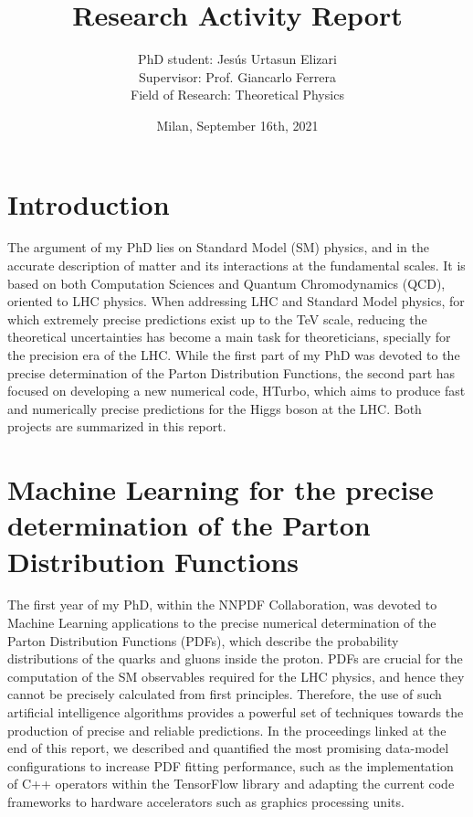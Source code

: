 \documentclass[12pt]{article}
\begin{document}
	
\title{Research Activity Report}
\author{PhD student: Jes\'us Urtasun Elizari \\
		Supervisor: Prof. Giancarlo Ferrera \\
		Field of Research: Theoretical Physics}
\date{Milan, September 16th, 2021}
\maketitle

\section{Introduction}

The argument of my PhD lies on Standard Model (SM) physics, and in the accurate description of matter and its interactions at the fundamental scales. It is based on both Computation Sciences and Quantum Chromodynamics (QCD), oriented to LHC physics. When addressing LHC and Standard Model physics, for which extremely precise predictions exist up to the TeV scale, reducing the theoretical uncertainties has become a main task for theoreticians, specially for the precision era of the LHC. While the first part of my PhD was devoted to the precise determination of the Parton Distribution Functions, the second part has focused on developing a new numerical code, HTurbo, which aims to produce fast and numerically precise predictions for the Higgs boson at the LHC. Both projects are summarized in this report.\\

\section{Machine Learning for the precise determination of the Parton Distribution Functions}
The first year of my PhD, within the NNPDF Collaboration, was devoted to Machine Learning applications to the precise numerical determination of the Parton Distribution Functions (PDFs), which describe the probability distributions of the quarks and gluons inside the proton. PDFs are crucial for the computation of the SM observables required for the LHC physics, and hence they cannot be precisely calculated from first principles. Therefore, the use of such artificial intelligence algorithms provides a powerful set of techniques towards the production of precise and reliable predictions. In the proceedings linked at the end of this report, we described and quantified the most promising data-model configurations to increase PDF fitting performance, such as the implementation of C++ operators within the TensorFlow library and adapting the current code frameworks to hardware accelerators such as graphics processing units.\\
\end{document}
